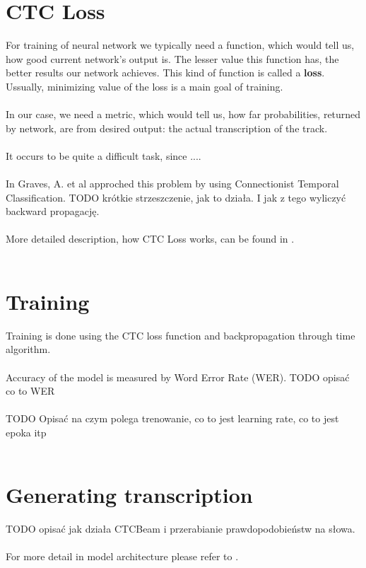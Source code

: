 \documentclass[licencjacka,en]{pracamgr}
\begin{document}
\section{CTC Loss}
For training of neural network we typically need a function, which would tell us, how good current network's output is. The lesser value this function has, the better results our network achieves. This kind of function is called a \textbf{loss}. Ussually, minimizing value of the loss is a main goal of training. \\\\
In our case, we need a metric, which would tell us, how far probabilities, returned by network, are from desired output: the actual transcription of the track.\\\\
It occurs to be quite a difficult task, since ....\\\\
In \cite{DS3} Graves, A. et al approched this problem by using Connectionist Temporal Classification.
TODO krótkie strzeszczenie, jak to działa. I jak z tego wyliczyć backward propagację. \\\\
More detailed description, how CTC Loss works, can be found in \cite{DS3}.\\\\

\section{Training}
Training is done using the CTC loss function and backpropagation through time algorithm. \\\\
Accuracy of the model is measured by Word Error Rate (WER). TODO opisać co to WER\\\\
TODO Opisać na czym polega trenowanie, co to jest learning rate, co to jest epoka itp \\\\

\section{Generating transcription}
TODO opisać jak działa CTCBeam i przerabianie prawdopodobieństw na słowa. \\\\

For more detail in model architecture please refer to \cite{DS2}.
\end{document}
